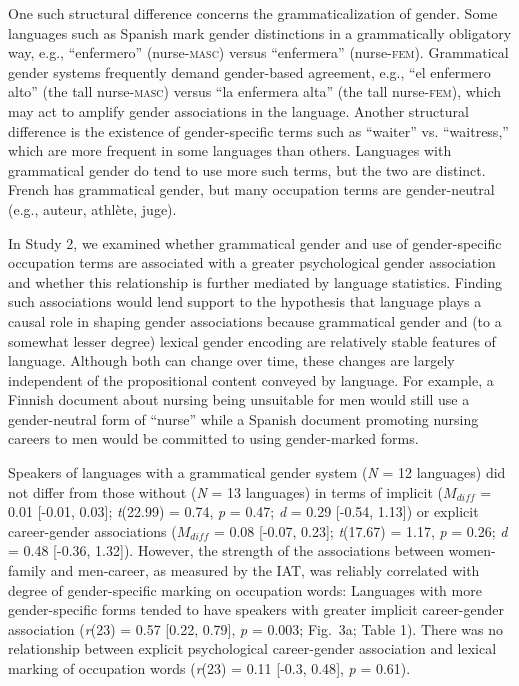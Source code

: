 \documentclass[11pt]{wlscirep}
\begin{document}
One such structural difference concerns the
grammaticalization of gender. Some languages such as Spanish mark gender
distinctions in a grammatically obligatory way, e.g.,
\enquote{enfermero} (nurse-\textsc{masc}) versus \enquote{enfermera}
(nurse-\textsc{fem}). Grammatical gender systems frequently demand
gender-based agreement, e.g., \enquote{el enfermero alto} (the tall
nurse-\textsc{masc}) versus \enquote{la enfermera alta} (the tall
nurse-\textsc{fem}), which may act to
amplify gender associations in the language. Another structural difference is the existence of gender-specific terms such as  \enquote{waiter} vs.
\enquote{waitress,} which are more frequent in some languages than others.  Languages with grammatical gender do tend to use
more such terms, but the two are distinct. French has grammatical
gender, but many occupation terms are gender-neutral (e.g., auteur,
athlète, juge).

In Study 2, we examined whether grammatical gender and use of
gender-specific occupation terms are associated with a greater
psychological gender association and whether this relationship is further
mediated by language statistics. Finding such associations would lend support to the hypothesis that language plays a causal role in shaping gender associations because grammatical gender and (to a somewhat lesser degree) lexical gender encoding are relatively stable features of language. Although both can change over time, these changes are largely independent of the propositional content conveyed by language. For example, a Finnish document about nursing being unsuitable for men would still use a gender-neutral form of
\enquote{nurse} while a Spanish document promoting nursing careers to
men would be committed to using gender-marked forms.


Speakers of languages with a grammatical gender system (\emph{N} = 12 languages) did not differ from those without (\emph{N} = 13 languages) in terms of implicit ($M_{diff}$ = 0.01 {[}-0.01, 0.03{]}; \emph{t}(22.99) = 0.74, \emph{p} = 0.47; \emph{d} = 0.29 {[}-0.54, 1.13{]}) or explicit career-gender associations ($M_{diff}$ = 0.08 {[}-0.07, 0.23{]}; \emph{t}(17.67) = 1.17, \emph{p} = 0.26; \emph{d} = 0.48 {[}-0.36, 1.32{]}). However, the strength of the associations between women-family and men-career, as measured by the IAT, was reliably correlated with degree of gender-specific marking on
occupation words: Languages with more gender-specific forms tended to
have speakers with greater implicit career-gender association (\emph{r}(23) = 0.57 {[}0.22, 0.79{]}, \emph{p} = 0.003; Fig.\ 3a; Table 1). There
was no relationship between explicit psychological career-gender association and
lexical marking of occupation words (\emph{r}(23) = 0.11 {[}-0.3, 0.48{]}, \emph{p} = 0.61).
\end{document}

